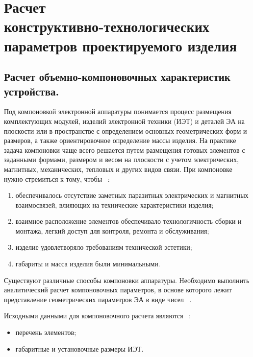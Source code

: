 
\section{Расчет \\
  конструктивно-технологических \\
  параметров проектируемого изделия}

\subsection{Расчет объемно-компоновочных характеристик устройства.}

Под компоновкой электронной аппаратуры понимается процесс размещения
комплектующих модулей, изделий электронной техники (ИЭТ) и деталей ЭА
на плоскости или в пространстве с определением основных геометрических
форм и размеров, а также ориентировочное определение массы изделия.
На практике задача компоновки чаще всего решается путем размещения
готовых элементов с заданными формами, размером и весом на плоскости с
учетом электрических, магнитных, механических, тепловых и других видов
связи. При компоновке нужно стремиться к тому, чтобы ~\cite{Kostukevich2012}:
\begin{enumerate}
\item обеспечивалось отсутствие заметных паразитных электрических и магнитных взаимосвязей,
  влияющих на технические характеристики изделия;
  
\item взаимное расположение элементов обеспечивало технологичность сборки и монтажа,
  легкий доступ для контроля, ремонта и обслуживания;
  
\item изделие удовлетворяло требованиям технической эстетики;
\item габариты и масса изделия были минимальными.
\end{enumerate}

Существуют различные способы компоновки аппаратуры.
Необходимо выполнить аналитический расчет компоновочных параметров,
в основе которого лежит представление геометрических параметров ЭА
в виде чисел ~\cite{Kostukevich2012}.

Исходными данными для компоновочного расчета являются
~\cite{Kostukevich2012}:
\begin{itemize}
\item перечень элементов;  
\item габаритные и установочные размеры ИЭТ.
\end{itemize}

